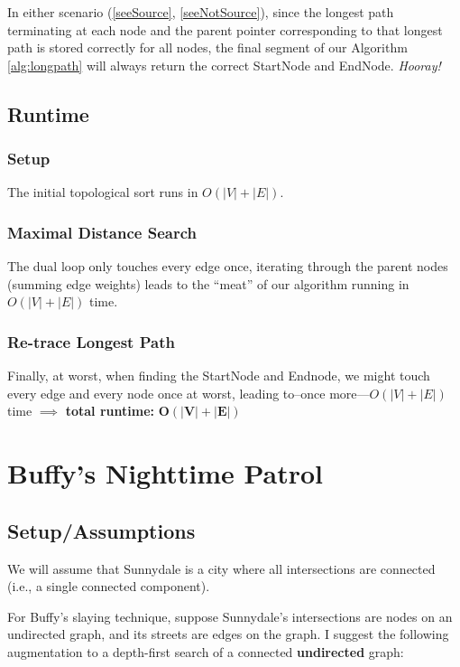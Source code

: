 \documentclass[conference]{styles/acmsiggraph}
\newcommand{\?}{\stackrel{?}{=}}
\begin{document}
In either scenario (\ref{seeSource}, \ref{seeNotSource}), since the longest path terminating at each node and the parent pointer corresponding to that longest path is stored correctly for all nodes, the final segment of our Algorithm \ref{alg:longpath} will always return the correct StartNode and EndNode.  \textit{Hooray!}

\subsection{Runtime}
\subsubsection{Setup}
The initial topological sort runs in $O(|V| + |E|)$.

\subsubsection{Maximal Distance Search}
The dual loop only touches every edge once, iterating through the parent nodes (summing edge weights) leads to the \enquote{meat} of our algorithm running in $O(|V| + |E|)$ time.

\subsubsection{Re-trace Longest Path}
Finally, at worst, when finding the StartNode and Endnode, we might touch every edge and every node once at worst, leading to--once more---$O(|V| + |E|)$ time
$\implies$ \textbf{total runtime:} $\mathbf{O(|V| + |E|)}$







\newpage
\section{Buffy's Nighttime Patrol}

\subsection{Setup/Assumptions}
We will assume that Sunnydale is a city where all intersections are connected (i.e., a single connected component).

For Buffy's slaying technique, suppose Sunnydale's intersections are nodes on an undirected graph, and its streets are edges on the graph.  I suggest the following augmentation to a depth-first search of a connected \textbf{undirected} graph:
\end{document}
